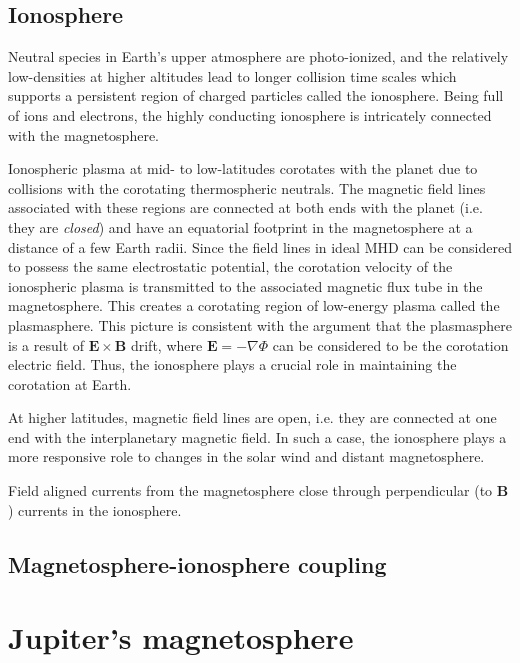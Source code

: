 \subsection{Ionosphere}
Neutral species in Earth's upper atmosphere are photo-ionized, and the relatively low-densities at higher altitudes lead to longer collision time scales which supports a persistent region of charged particles called the ionosphere. Being full of ions and electrons, the highly conducting ionosphere is intricately connected with the magnetosphere.

Ionospheric plasma at mid- to low-latitudes corotates with the planet due to collisions with the corotating thermospheric neutrals. The magnetic field lines associated with these regions are connected at both ends with the planet (i.e. they are \emph{closed}) and have an equatorial footprint in the magnetosphere at a distance of a few Earth radii. Since the field lines in ideal MHD can be considered to possess the same electrostatic potential, the corotation velocity of the ionospheric plasma is transmitted to the associated magnetic flux tube in the magnetosphere. This creates a corotating region of low-energy plasma called the plasmasphere. This picture is consistent with the argument that the plasmasphere is a result of $\mathbf{E}\times\mathbf{B}$ drift, where $\mathbf{E}=-\nabla \Phi$ can be considered to be the corotation electric field. Thus, the ionosphere plays a crucial role in maintaining the corotation at Earth. 

At higher latitudes, magnetic field lines are open, i.e. they are connected at one end with the interplanetary magnetic field. In such a case, the ionosphere plays a more responsive role to changes in the solar wind and distant magnetosphere. 

Field aligned currents from the magnetosphere close through perpendicular (to $\mathbf{B}$) currents in the ionosphere. 






\subsection{Magnetosphere-ionosphere coupling}


\section{Jupiter's magnetosphere}


